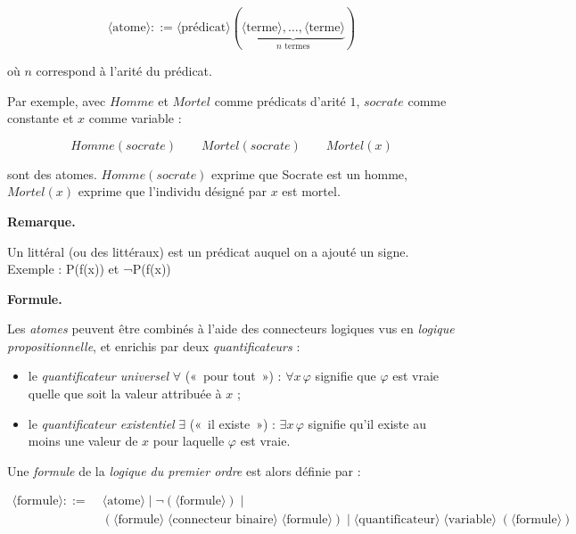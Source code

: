 \documentclass[11pt]{article}
\newenvironment{remarque}{%
    \begin{mdframed}[
        linecolor=sectioncolor!40,
        linewidth=0.8pt,
        backgroundcolor=sectioncolor!5,
        innerleftmargin=10pt,
        innerrightmargin=10pt,
        innertopmargin=6pt,
        innerbottommargin=6pt,
        skipabove=8pt,
        skipbelow=8pt
    ]
    \noindent\textbf{\small\color{sectioncolor}Remarque.}\enspace\small\itshape
}{%
    \end{mdframed}
}
\begin{document}
\vspace{0.2cm}
\[
\langle\text{atome}\rangle ::= \langle\text{prédicat}\rangle
(\underbrace{\langle\text{terme}\rangle, \ldots,
\langle\text{terme}\rangle}_{n \text{ termes}})
\]

\noindent où $n$ correspond à l'arité du prédicat.

\vspace{0.2cm}
Par exemple, avec $\mathit{Homme}$ et $\mathit{Mortel}$ comme prédicats d'arité $1$, $\mathit{socrate}$ comme constante et $x$ comme variable :

$$
\mathit{Homme}(\mathit{socrate}) \qquad \mathit{Mortel}(\mathit{socrate}) 
\qquad \mathit{Mortel}(x)
$$

sont des atomes. $\mathit{Homme}(\mathit{socrate})$ exprime que Socrate est un homme, $\mathit{Mortel}(x)$ exprime que l'individu désigné par $x$ est mortel.

\begin{remarque}
    Un littéral (ou des littéraux) est un prédicat auquel on a ajouté un signe.\\
    Exemple : P(f(x)) et ¬P(f(x))
\end{remarque}

\vspace{0.4cm}
\noindent\textbf{Formule.}
\vspace{0.2cm}

Les \textit{atomes} peuvent être combinés à l'aide des connecteurs logiques vus en \textit{logique propositionnelle}, et enrichis par deux \textit{quantificateurs} :
\begin{itemize}
    \item le \textit{quantificateur universel} $\forall$ («~pour tout~») : 
    $\forall x\, \varphi$ signifie que $\varphi$ est vraie quelle que soit 
    la valeur attribuée à $x$ ;
    \item le \textit{quantificateur existentiel} $\exists$ («~il existe~») : 
    $\exists x\, \varphi$ signifie qu'il existe au moins une valeur de $x$ 
    pour laquelle $\varphi$ est vraie.
\end{itemize}

\vspace{0.2cm}
Une \textit{formule} de la \textit{logique du premier ordre} est alors définie par :

\[
\begin{aligned}
\langle\text{formule}\rangle ::= \; 
&\langle\text{atome}\rangle \mid
\neg(\langle\text{formule}\rangle) \mid \\
&(\langle\text{formule}\rangle\;\langle\text{connecteur binaire}\rangle\;\langle\text{formule}\rangle) \mid
\langle\text{quantificateur}\rangle\;\langle\text{variable}\rangle\;(\langle\text{formule}\rangle)
\end{aligned}
\]
\end{document}

